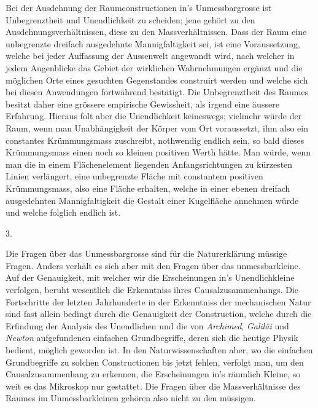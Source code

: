 \documentclass[a4paper,12pt]{article}
\begin{document}
Bei der Ausdehnung der Raumconstructionen in's Unmessbargrosse
ist Unbegrenztheit und Unendlichkeit zu scheiden; jene geh\"{o}rt
zu den Ausdehnungsverh\"{a}ltnissen, diese zu den
Massverh\"{a}ltnissen.  Dass der Raum eine unbegrenzte dreifach
ausgedehnte Mannigfaltigkeit sei, ist eine Voraussetzung, welche
bei jeder Auffassung der Aussenwelt angewandt wird, nach welcher
in jedem Augenblicke das Gebiet der wirklichen Wahrnehmungen
erg\"{a}nzt und die m\"{o}glichen Orte eines gesuchten
Gegenstandes construirt werden und welche sich bei diesen
Anwendungen fortw\"{a}hrend best\"{a}tigt.  Die Unbegrenztheit
des Raumes besitzt daher eine gr\"{o}ssere empirische Gewissheit,
als irgend eine \"{a}ussere Erfahrung.  Hieraus folt aber die
Unendlichkeit keineswegs; vielmehr w\"{u}rde der Raum, wenn man
Unabh\"{a}ngigkeit der K\"{o}rper vom Ort voraussetzt, ihm also
ein constantes Kr\"{u}mmungsmass zuschreibt, nothwendig endlich
sein, so bald dieses Kr\"{u}mmungsmass einen noch so kleinen
positiven Werth h\"{a}tte.  Man w\"{u}rde, wenn man die in einem
Fl\"{a}chenelement liegenden Anfangsrichtungen zu k\"{u}rzesten
Linien verl\"{a}ngert, eine unbegrenzte Fl\"{a}che mit constantem
positiven Kr\"{u}mmungsmass, also eine Fl\"{a}che erhalten,
welche in einer ebenen dreifach ausgedehnten Mannigfaltigkeit die
Gestalt einer Kugelfl\"{a}che annehmen w\"{u}rde und welche
folglich endlich ist.

\medbreak

\centerline{3.}

\nobreak\medskip

Die Fragen \"{u}ber das Unmessbargrosse sind f\"{u}r die
Naturerkl\"{a}rung m\"{u}ssige Fragen.  Anders verh\"{a}lt es
sich aber mit den Fragen \"{u}ber das unmessbarkleine.  Auf der
Genauigkeit, mit welcher wir die Erscheinungen in's
Unendlichkleine verfolgen, beruht wesentlich die Erkenntniss
ihres Causalzusammenhangs.  Die Fortschritte der letzten
Jahrhunderte in der Erkenntniss der mechanischen Natur sind fast
allein bedingt durch die Genauigkeit der Construction, welche
durch die Erfindung der Analysis des Unendlichen und die von
\emph{Archimed}, \emph{Galil\"{a}i} und \emph{Newton}
aufgefundenen einfachen Grundbegriffe, deren sich die heutige
Physik bedient, m\"{o}glich geworden ist.  In den
Naturwissenschaften aber, wo die einfachen Grundbegriffe zu
solchen Constructionen bis jetzt fehlen, verfolgt man, um den
Causalzusammenhang zu erkennen, die Erscheinungen in's
r\"{a}umlich Kleine, so weit es das Mikroskop nur gestattet.  Die
Fragen \"{u}ber die Massverh\"{a}ltnisse des Raumes im
Unmessbarkleinen geh\"{o}ren also nicht zu den m\"{u}ssigen.
\end{document}
